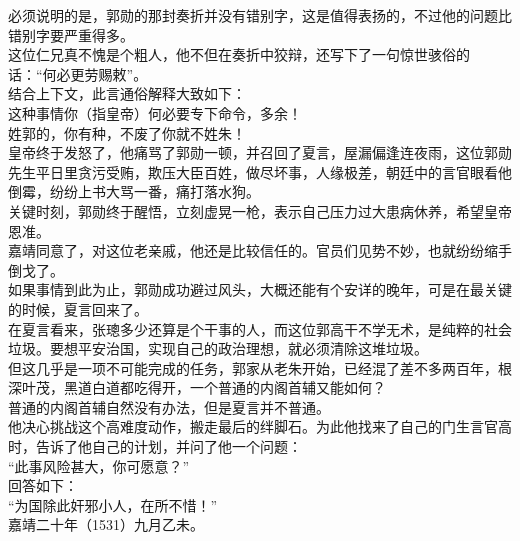 \begin{multicols}{\theparacolNo}
必须说明的是，郭勋的那封奏折并没有错别字，这是值得表扬的，不过他的问题比错别字要严重得多。\\

这位仁兄真不愧是个粗人，他不但在奏折中狡辩，还写下了一句惊世骇俗的话：“何必更劳赐敕”。\\

结合上下文，此言通俗解释大致如下：\\

这种事情你（指皇帝）何必要专下命令，多余！\\

姓郭的，你有种，不废了你就不姓朱！\\

皇帝终于发怒了，他痛骂了郭勋一顿，并召回了夏言，屋漏偏逢连夜雨，这位郭勋先生平日里贪污受贿，欺压大臣百姓，做尽坏事，人缘极差，朝廷中的言官眼看他倒霉，纷纷上书大骂一番，痛打落水狗。\\

关键时刻，郭勋终于醒悟，立刻虚晃一枪，表示自己压力过大患病休养，希望皇帝恩准。\\

嘉靖同意了，对这位老亲戚，他还是比较信任的。官员们见势不妙，也就纷纷缩手倒戈了。\\

如果事情到此为止，郭勋成功避过风头，大概还能有个安详的晚年，可是在最关键的时候，夏言回来了。\\

在夏言看来，张璁多少还算是个干事的人，而这位郭高干不学无术，是纯粹的社会垃圾。要想平安治国，实现自己的政治理想，就必须清除这堆垃圾。\\

但这几乎是一项不可能完成的任务，郭家从老朱开始，已经混了差不多两百年，根深叶茂，黑道白道都吃得开，一个普通的内阁首辅又能如何？\\

普通的内阁首辅自然没有办法，但是夏言并不普通。\\

他决心挑战这个高难度动作，搬走最后的绊脚石。为此他找来了自己的门生言官高时，告诉了他自己的计划，并问了他一个问题：\\

“此事风险甚大，你可愿意？”\\

回答如下：\\

“为国除此奸邪小人，在所不惜！”\\

嘉靖二十年（1531）九月乙未。\\


\end{multicols}
